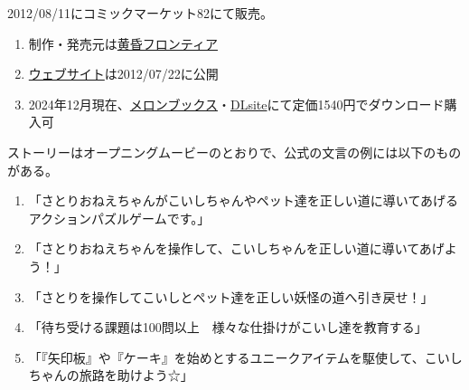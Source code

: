 

%




2012/08/11にコミックマーケット82にて販売。
\begin{enumerate}[label={\sarrow}]
\item 制作・発売元は\href{http://tasofro.net/}{黄昏フロンティア}
\item \href{http://tasofro.net/satori/}{ウェブサイト}は2012/07/22に公開
\item 2024年12月現在、\href{https://www.melonbooks.co.jp/detail/detail.php?product_id=967172}{メロンブックス}・\href{https://www.dlsite.com/home/work/=/product_id/RJ144848.html}{DLsite}にて定価1540円でダウンロード購入可
\end{enumerate}



ストーリーはオープニングムービーのとおりで、公式の文言の例には以下のものがある。
\begin{enumerate}[label={\sarrow}]
\item 「さとりおねえちゃんがこいしちゃんやペット達を正しい道に導いてあげるアクションパズルゲームです。」
\item 「さとりおねえちゃんを操作して、こいしちゃんを正しい道に導いてあげよう！」
\item 「さとりを操作してこいしとペット達を正しい妖怪の道へ引き戻せ！」
\item 「待ち受ける課題は100問以上　様々な仕掛けがこいし達を教育する」
\item 「『矢印板』や『ケーキ』を始めとするユニークアイテムを駆使して、こいしちゃんの旅路を助けよう☆」
\end{enumerate}



